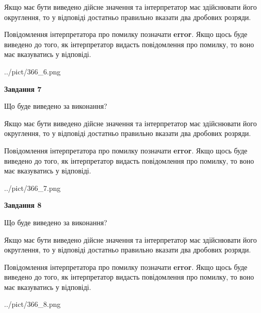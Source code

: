 \documentclass[12pt, ukrainian]{article}
\begin{document}
{\begin {Large}
Якщо має бути виведено дійсне значення та інтерпретатор має здійснювати його округлення, 
то у відповіді достатньо правильно вказати два дробових розряди.

Повідомлення інтерпретатора про помилку позначати \textbf{error}.
Якщо щось буде виведено до того, як інтерпретатор видасть повідомлення про помилку, 
то воно має вказуватись у відповіді. \par

\begin{center}
	{../pict/366_6.png}
\end{center}
\newpage

{\begin {center}\textbf{Завдання 7}\end {center}}\par
Що буде виведено за виконання? \par

Якщо має бути виведено дійсне значення та інтерпретатор має здійснювати його округлення, 
то у відповіді достатньо правильно вказати два дробових розряди.

Повідомлення інтерпретатора про помилку позначати \textbf{error}.
Якщо щось буде виведено до того, як інтерпретатор видасть повідомлення про помилку, 
то воно має вказуватись у відповіді. \par

\begin{center}
	{../pict/366_7.png}
\end{center}
\newpage

{\begin {center}\textbf{Завдання 8}\end {center}}\par
Що буде виведено за виконання? \par

Якщо має бути виведено дійсне значення та інтерпретатор має здійснювати його округлення, 
то у відповіді достатньо правильно вказати два дробових розряди.

Повідомлення інтерпретатора про помилку позначати \textbf{error}.
Якщо щось буде виведено до того, як інтерпретатор видасть повідомлення про помилку, 
то воно має вказуватись у відповіді. \par

\begin{center}
	{../pict/366_8.png}
\end{center}
\newpage


\end{Large}}
\end{document}
